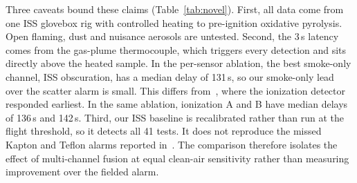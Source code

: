 Three caveats bound these claims (Table~\ref{tab:novel}). First, all data come from one ISS glovebox rig with controlled heating to pre-ignition oxidative pyrolysis. Open flaming, dust and nuisance aerosols are untested. Second, the 3\,s latency comes from the gas-plume thermocouple, which triggers every detection and sits directly above the heated sample. In the per-sensor ablation, the best smoke-only channel, ISS obscuration, has a median delay of 131\,s, so our smoke-only lead over the scatter alarm is small. This differs from~\cite{guzman2026early}, where the ionization detector responded earliest. In the same ablation, ionization A and B have median delays of 136\,s and 142\,s. Third, our ISS baseline is recalibrated rather than run at the flight threshold, so it detects all 41 tests. It does not reproduce the missed Kapton and Teflon alarms reported in~\cite{fortenberry2021research}. The comparison therefore isolates the effect of multi-channel fusion at equal clean-air sensitivity rather than measuring improvement over the fielded alarm.

